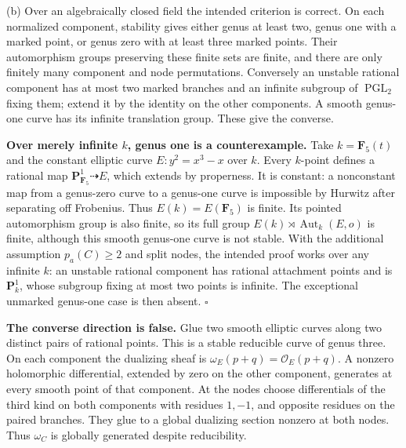 \documentclass[11pt]{article}
\let\chapterexercise\exercise
\renewcommand{\exercise}[2]{\Needspace{8\baselineskip}\chapterexercise{#1}{#2}}
\begin{document}
(b) Over an algebraically closed field the intended criterion is correct. On each normalized component, stability gives either genus at least two, genus one with a marked point, or genus zero with at least three marked points. Their automorphism groups preserving these finite sets are finite, and there are only finitely many component and node permutations. Conversely an unstable rational component has at most two marked branches and an infinite subgroup of $\operatorname{PGL}_2$ fixing them; extend it by the identity on the other components. A smooth genus-one curve has its infinite translation group. These give the converse.

\textbf{Over merely infinite $k$, genus one is a counterexample.} Take $k=\mathbf F_5(t)$ and the constant elliptic curve $E:y^2=x^3-x$ over $k$. Every $k$-point defines a rational map $\mathbf P^1_{\mathbf F_5}\dashrightarrow E$, which extends by properness. It is constant: a nonconstant map from a genus-zero curve to a genus-one curve is impossible by Hurwitz after separating off Frobenius. Thus $E(k)=E(\mathbf F_5)$ is finite. Its pointed automorphism group is also finite, so its full group $E(k)\rtimes\operatorname{Aut}_k(E,o)$ is finite, although this smooth genus-one curve is not stable. With the additional assumption $p_a(C)\ge2$ and split nodes, the intended proof works over any infinite $k$: an unstable rational component has rational attachment points and is $\mathbf P^1_k$, whose subgroup fixing at most two points is infinite. The exceptional unmarked genus-one case is then absent. \hfill$\square$

\pf \textbf{The converse direction is false.} Glue two smooth elliptic curves along two distinct pairs of rational points. This is a stable reducible curve of genus three. On each component the dualizing sheaf is $\omega_E(p+q)=\mathcal O_E(p+q)$. A nonzero holomorphic differential, extended by zero on the other component, generates at every smooth point of that component. At the nodes choose differentials of the third kind on both components with residues $1,-1$, and opposite residues on the paired branches. They glue to a global dualizing section nonzero at both nodes. Thus $\omega_C$ is globally generated despite reducibility.
\end{document}
